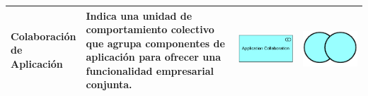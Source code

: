 {\begin{longtable}{|p{0.15\linewidth}|p{0.45\linewidth}|p{0.2\linewidth} p{0.2\linewidth}|}
    	
    	
    	Colaboración de Aplicación 
    	&
    	Indica una unidad de comportamiento colectivo que agrupa componentes de aplicación para ofrecer una funcionalidad empresarial conjunta. 
    	&
    	\begin{center}
    		\includegraphics[width=1\linewidth]{imgs/Aplication_collaboration.pdf}
    	\end{center} &
    	\begin{center}
    		\includegraphics[width=0.7\linewidth]{imgs/collaboration.pdf}
    	\end{center}
    	\\ \hline
    	
    	
    	

\end{longtable}}
